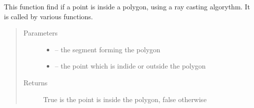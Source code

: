 \documentclass[letterpaper,10pt,english]{sphinxmanual}
\begin{document}

\begin{fulllineitems}
\label{\detokenize{index:src.manage_grid_8.inside_polygon}}
This function find if a point is inside a polygon, using a ray casting algorythm. It is called by various functions.
\begin{quote}\begin{description}
\item[{Parameters}] \leavevmode\begin{itemize}
\item {} 
 -- the segment forming the polygon

\item {} 
 -- the point which is indide or outside the polygon

\end{itemize}

\item[{Returns}] \leavevmode
True is the point is inside the polygon, false otherwise

\end{description}\end{quote}

\end{fulllineitems}

\end{document}
